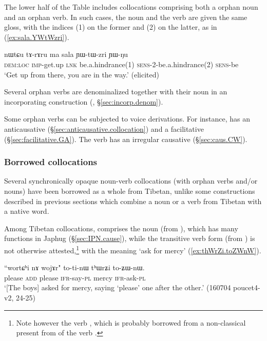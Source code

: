 The lower half of the Table includes collocations comprising both a orphan noun and an orphan verb. In such cases, the noun and the verb are given the same gloss, with the indices (1) on the former and (2) on the latter, as in (\ref{ex:sala.YWtWzri}). %

\begin{exe}
\ex \label{ex:sala.YWtWzri}
\gll nɯtɕu tɤ-rɤru ma sala ɲɯ-tɯ-zri ɲɯ-ŋu \\
\textsc{dem}:\textsc{loc} \textsc{imp}-get.up \textsc{lnk} be.a.hindrance(1) \textsc{sens}-2-be.a.hindrance(2) \textsc{sens}-be \\
\glt `Get up from there, you are in the way.' (elicited)
\end{exe}

Several orphan verbs are denominalized together with their noun in an incorporating construction (, §\ref{sec:incorp.denom}).

Some orphan verbs can be subjected to voice derivations. For instance,  has an anticausative  (§\ref{sec:anticausative.collocation}) and a facilitative (§\ref{sec:facilitative.GA}). The verb  has an irregular  causative (§\ref{sec:caus.CW}).


\subsubsection{Borrowed collocations} \label{sec:borrowed.NV}
Several synchronically opaque noun-verb collocations (with orphan verbs and/or nouns) have been borrowed as a whole from Tibetan, unlike some constructions described in previous sections which combine a noun or a verb from Tibetan with a native word.

Among Tibetan collocations,  comprises the noun   (from ), which has many functions in Japhug (§\ref{sec:IPN.cause}), while the  transitive verb form  (from ) is not otherwise attested,\footnote{Note however the verb , which is probably borrowed from a non-classical present from  of the verb . } with the meaning `ask for mercy' (\ref{ex:thWrZi.toZWnW}).

\begin{exe}
\ex \label{ex:thWrZi.toZWnW}
\gll ``wortɕʰi nɤ wojɤr" to-ti-nɯ tʰɯrʑi to-ʑɯ-nɯ. \\
please \textsc{add} please \textsc{ifr}-say-\textsc{pl} mercy \textsc{ifr}-ask-\textsc{pl} \\
\glt `[The boys] asked for mercy, saying `please' one after the other.' (160704 poucet4-v2, 24-25)
 \end{exe}  
 

